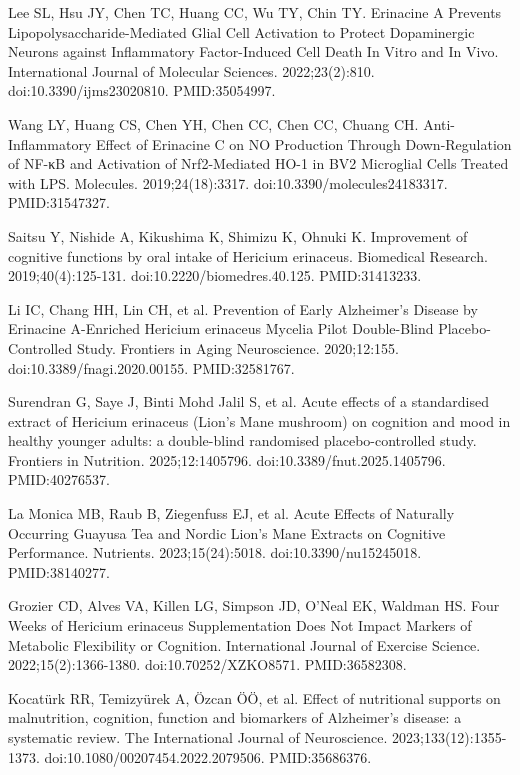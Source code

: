 \documentclass[12pt,oneside]{book}
\newcommand{\reff}[2]{\par\hangindent=7mm\hangafter=1\noindent[#1]\hspace{2mm}#2\par}
\begin{document}
\reff{38}{Lee SL, Hsu JY, Chen TC, Huang CC, Wu TY, Chin TY. Erinacine A Prevents Lipopolysaccharide-Mediated Glial Cell Activation to Protect Dopaminergic Neurons against Inflammatory Factor-Induced Cell Death In Vitro and In Vivo. International Journal of Molecular Sciences. 2022;23(2):810. doi:10.3390/ijms23020810. PMID:35054997.}

\reff{39}{Wang LY, Huang CS, Chen YH, Chen CC, Chen CC, Chuang CH. Anti-Inflammatory Effect of Erinacine C on NO Production Through Down-Regulation of NF-κB and Activation of Nrf2-Mediated HO-1 in BV2 Microglial Cells Treated with LPS. Molecules. 2019;24(18):3317. doi:10.3390/molecules24183317. PMID:31547327.}

\reff{40}{Saitsu Y, Nishide A, Kikushima K, Shimizu K, Ohnuki K. Improvement of cognitive functions by oral intake of Hericium erinaceus. Biomedical Research. 2019;40(4):125-131. doi:10.2220/biomedres.40.125. PMID:31413233.}

\reff{41}{Li IC, Chang HH, Lin CH, et al. Prevention of Early Alzheimer's Disease by Erinacine A-Enriched Hericium erinaceus Mycelia Pilot Double-Blind Placebo-Controlled Study. Frontiers in Aging Neuroscience. 2020;12:155. doi:10.3389/fnagi.2020.00155. PMID:32581767.}

\reff{42}{Surendran G, Saye J, Binti Mohd Jalil S, et al. Acute effects of a standardised extract of Hericium erinaceus (Lion's Mane mushroom) on cognition and mood in healthy younger adults: a double-blind randomised placebo-controlled study. Frontiers in Nutrition. 2025;12:1405796. doi:10.3389/fnut.2025.1405796. PMID:40276537.}

\reff{43}{La Monica MB, Raub B, Ziegenfuss EJ, et al. Acute Effects of Naturally Occurring Guayusa Tea and Nordic Lion's Mane Extracts on Cognitive Performance. Nutrients. 2023;15(24):5018. doi:10.3390/nu15245018. PMID:38140277.}

\reff{44}{Grozier CD, Alves VA, Killen LG, Simpson JD, O'Neal EK, Waldman HS. Four Weeks of Hericium erinaceus Supplementation Does Not Impact Markers of Metabolic Flexibility or Cognition. International Journal of Exercise Science. 2022;15(2):1366-1380. doi:10.70252/XZKO8571. PMID:36582308.}

\reff{45}{Kocatürk RR, Temizyürek A, Özcan ÖÖ, et al. Effect of nutritional supports on malnutrition, cognition, function and biomarkers of Alzheimer's disease: a systematic review. The International Journal of Neuroscience. 2023;133(12):1355-1373. doi:10.1080/00207454.2022.2079506. PMID:35686376.}
\end{document}
